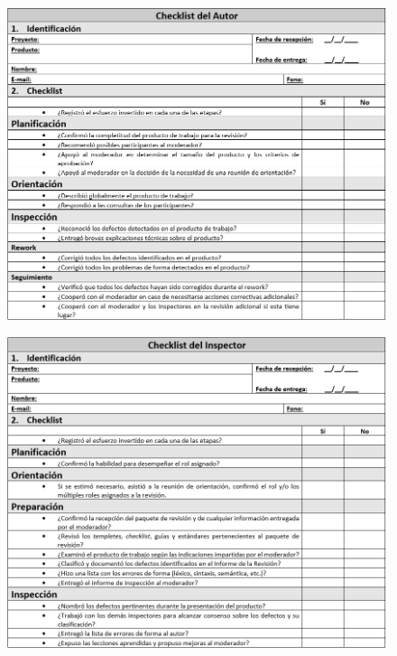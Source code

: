 \begin{figure}[H]
\centering
\includegraphics[width=1\textwidth]{figures/anexos/4-2.PNG}
\end{figure}

\begin{figure}[H]
\centering
\includegraphics[width=1\textwidth]{figures/anexos/4-3.PNG}
\end{figure}


